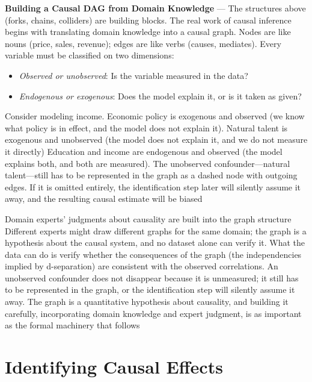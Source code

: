 \textbf{Building a Causal DAG from Domain Knowledge} --- The structures above (forks,
chains, colliders) are building blocks. The real work of causal inference begins
with translating domain knowledge into a causal graph. Nodes are like nouns (price,
sales, revenue); edges are like verbs (causes, mediates). Every variable must be
classified on two dimensions:

\begin{itemize}
  \item \emph{Observed or unobserved}: Is the variable measured in the data?

  \item \emph{Endogenous or exogenous}: Does the model explain it, or is it
    taken as given?
\end{itemize}

Consider modeling income. Economic policy is exogenous and observed (we know
what policy is in effect, and the model does not explain it). Natural talent is exogenous
and unobserved (the model does not explain it, and we do not measure it directly)
Education and income are endogenous and observed (the model explains both, and
both are measured). The unobserved confounder—natural talent—still has to be
represented in the graph as a dashed node with outgoing edges. If it is omitted entirely,
the identification step later will silently assume it away, and the resulting causal
estimate will be biased

Domain experts' judgments about causality are built into the graph structure Different
experts might draw different graphs for the same domain; the graph is a
hypothesis about the causal system, and no dataset alone can verify it. What the
data can do is verify whether the consequences of the graph (the independencies implied
by d-separation) are consistent with the observed correlations. An unobserved confounder
does not disappear because it is unmeasured; it still has to be represented in
the graph, or the identification step will silently assume it away. The graph is
a quantitative hypothesis about causality, and building it carefully,
incorporating domain knowledge and expert judgment, is as important as the formal
machinery that follows

\section{Identifying Causal Effects}
\label{sec:identifying-causal-effects}

